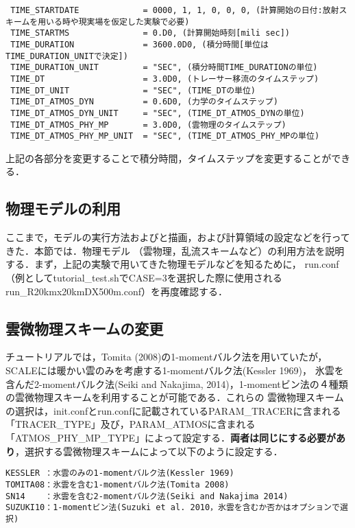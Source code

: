 \begin{verbatim}
 TIME_STARTDATE             = 0000, 1, 1, 0, 0, 0, (計算開始の日付:放射スキームを用いる時や現実場を仮定した実験で必要)
 TIME_STARTMS               = 0.D0, (計算開始時刻[mili sec])
 TIME_DURATION              = 3600.0D0, (積分時間[単位はTIME_DURATION_UNITで決定])
 TIME_DURATION_UNIT         = "SEC", (積分時間TIME_DURATIONの単位)
 TIME_DT                    = 3.0D0, (トレーサー移流のタイムステップ)
 TIME_DT_UNIT               = "SEC", (TIME_DTの単位)
 TIME_DT_ATMOS_DYN          = 0.6D0, (力学のタイムステップ)
 TIME_DT_ATMOS_DYN_UNIT     = "SEC", (TIME_DT_ATMOS_DYNの単位)
 TIME_DT_ATMOS_PHY_MP       = 3.0D0, (雲物理のタイムステップ)
 TIME_DT_ATMOS_PHY_MP_UNIT  = "SEC", (TIME_DT_ATMOS_PHY_MPの単位)
\end{verbatim}

上記の各部分を変更することで積分時間，タイムステップを変更することができる．

\subsection{物理モデルの利用}
ここまで，モデルの実行方法およびと描画，および計算領域の設定などを行ってきた．本節では．物理モデル
（雲物理，乱流スキームなど）の利用方法を説明する．まず，上記の実験で用いてきた物理モデルなどを知るために，
run.conf（例としてtutorial\_test.shでCASE=3を選択した際に使用されるrun\_R20kmx20kmDX500m.conf）を再度確認する．


\subsection{雲微物理スキームの変更}
チュートリアルでは，Tomita (2008)の1-momentバルク法を用いていたが，SCALEには暖かい雲のみを考慮する1-momentバルク法(Kessler 1969)，
氷雲を含んだ2-momentバルク法(Seiki and Nakajima, 2014)，1-momentビン法の４種類の雲微物理スキームを利用することが可能である．これらの
雲微物理スキームの選択は，init.confとrun.confに記載されているPARAM\_TRACERに含まれる「TRACER\_TYPE」及び，PARAM\_ATMOSに含まれる
「ATMOS\_PHY\_MP\_TYPE」によって設定する．{\bf 両者は同じにする必要があり}，選択する雲微物理スキームによって以下のように設定する．

\begin{verbatim}
KESSLER ：水雲のみの1-momentバルク法(Kessler 1969)
TOMITA08：氷雲を含む1-momentバルク法(Tomita 2008)
SN14    ：氷雲を含む2-momentバルク法(Seiki and Nakajima 2014)
SUZUKI10：1-momentビン法(Suzuki et al. 2010，氷雲を含むか否かはオプションで選択)
\end{verbatim}

